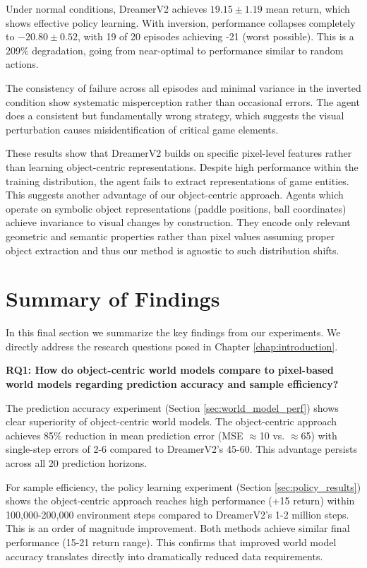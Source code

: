 \documentclass[
	english,
	ruledheaders=section,
	class=report,
	thesis={type=master},
	accentcolor=9c,
	custommargins=true,
	marginpar=false,
	parskip=half-,
	fontsize=11pt,
	pdfa=true,
]{tudapub}
\newcommand{\worldmodel}{world model}
\begin{document}
Under normal conditions, DreamerV2 achieves $19.15 \pm 1.19$ mean return, which
shows effective policy learning. With inversion, performance collapses
completely to $-20.80 \pm 0.52$, with 19 of 20 episodes achieving -21 (worst
possible). This is a 209\% degradation, going from near-optimal to performance
similar to random actions.

The consistency of failure across all episodes and minimal variance in the
inverted condition show systematic misperception rather than occasional errors.
The agent does a consistent but fundamentally wrong strategy, which suggests
the visual perturbation causes misidentification of critical game elements.

These results show that DreamerV2 builds on specific pixel-level features
rather than learning object-centric representations. Despite high performance
within the training distribution, the agent fails to extract representations of
game entities. This suggests another advantage of our object-centric approach.
Agents which operate on symbolic object representations (paddle positions, ball
coordinates) achieve invariance to visual changes by construction. They encode
only relevant geometric and semantic properties rather than pixel values
assuming proper object extraction and thus our method is agnostic to such distribution 
shifts.


\section{Summary of Findings}
\label{sec:summary}

In this final section we summarize the key findings from our experiments. We
directly address the research questions posed in Chapter
\ref{chap:introduction}.

\textbf{RQ1: How do object-centric \worldmodel{}s compare to pixel-based \worldmodel{}s
	regarding prediction accuracy and sample efficiency?}

The prediction accuracy experiment (Section \ref{sec:world_model_perf}) shows
clear superiority of object-centric \worldmodel{}s. The object-centric approach
achieves 85\% reduction in mean prediction error (MSE $\approx$10 vs.
$\approx$65) with single-step errors of 2-6 compared to DreamerV2's 45-60. This
advantage persists across all 20 prediction horizons.

For sample efficiency, the policy learning experiment (Section
\ref{sec:policy_results}) shows the object-centric approach reaches high
performance (+15 return) within 100,000-200,000 environment steps compared to
DreamerV2's 1-2 million steps. This is an order of magnitude improvement. Both
methods achieve similar final performance (15-21 return range). This confirms
that improved \worldmodel{} accuracy translates directly into dramatically
reduced data requirements.
\end{document}
